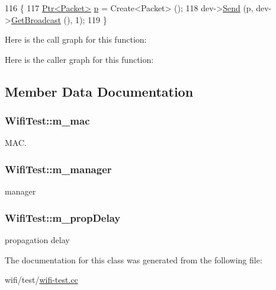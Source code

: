 \begin{DoxyCode}
116 \{
117   \hyperlink{classns3_1_1Ptr}{Ptr<Packet>} \hyperlink{lte__link__budget_8m_ac9de518908a968428863f829398a4e62}{p} = Create<Packet> ();
118   dev->\hyperlink{classns3_1_1WifiNetDevice_a14b6919a10da25e74e1c92554106b2c6}{Send} (p, dev->\hyperlink{classns3_1_1WifiNetDevice_a1f57fa65d2e877ab6ea7739d34de2abb}{GetBroadcast} (), 1);
119 \}
\end{DoxyCode}


Here is the call graph for this function\+:




Here is the caller graph for this function\+:




\subsection{Member Data Documentation}
\subsubsection[{\texorpdfstring{m\+\_\+mac}{m_mac}}]{ Wifi\+Test\+::m\+\_\+mac\hspace{0.3cm}{\ttfamily [private]}}\hypertarget{classWifiTest_a45a5cd8ad4b8ca5e785db91c9fc1c20a}{}\label{classWifiTest_a45a5cd8ad4b8ca5e785db91c9fc1c20a}


M\+AC. 

\subsubsection[{\texorpdfstring{m\+\_\+manager}{m_manager}}]{ Wifi\+Test\+::m\+\_\+manager\hspace{0.3cm}{\ttfamily [private]}}\hypertarget{classWifiTest_aba977fcd0815e799f16e769c615dfd8e}{}\label{classWifiTest_aba977fcd0815e799f16e769c615dfd8e}


manager 

\subsubsection[{\texorpdfstring{m\+\_\+prop\+Delay}{m_propDelay}}]{ Wifi\+Test\+::m\+\_\+prop\+Delay\hspace{0.3cm}{\ttfamily [private]}}\hypertarget{classWifiTest_ae19ff71a7dc4621cb18292895054891d}{}\label{classWifiTest_ae19ff71a7dc4621cb18292895054891d}


propagation delay 



The documentation for this class was generated from the following file\+:\begin{DoxyCompactItemize}
\item 
wifi/test/\hyperlink{wifi-test_8cc}{wifi-\/test.\+cc}\end{DoxyCompactItemize}
